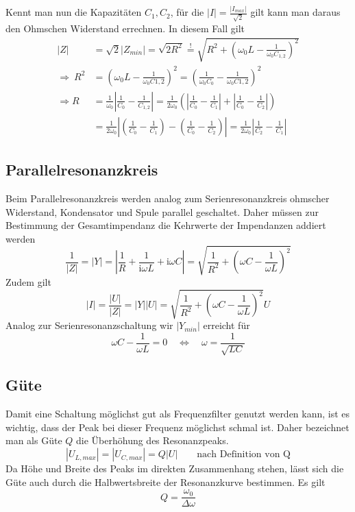 Kennt man nun die Kapazitäten $ C_1, C_2 $, für die $ |I| = \frac{|I_{max}|}{\sqrt{2}} $ gilt kann man daraus den Ohmschen Widerstand errechnen. In diesem Fall gilt \begin{align}
	|Z| &= \sqrt 2 |Z_{min}| = \sqrt{2 R^2} \stackrel{!}{=} \sqrt{R^2 + \left(\omega_0 L - \frac{1}{\omega_0 C_{1,2}}\right)^2} \\
	\Rightarrow~ R^2 &= \left(\omega_0 L - \frac{1}{\omega_0 C{1,2}}\right)^2 = \left(\frac{1}{\omega_0C_0} - \frac{1}{\omega_0 C{1,2}}\right)^2 \\
	\Rightarrow R &= \frac{1}{\omega_0} \left|\frac{1}{C_0} - \frac{1}{C_{1,2}}\right|
		= \frac{1}{2\omega_0} \left(\left|\frac{1}{C_0} - \frac{1}{C_1}\right| + \left|\frac{1}{C_0} - \frac{1}{C_2}\right|\right) \\
		&= \frac{1}{2\omega_0} \left|\left(\frac{1}{C_0} - \frac{1}{C_1}\right) - \left(\frac{1}{C_0} - \frac{1}{C_2}\right)\right| 
		= \frac{1}{2\omega_0} \left|\frac{1}{C_2} - \frac{1}{C_1}\right|
\end{align}
\subsection{Parallelresonanzkreis}
Beim Parallelresonanzkreis werden analog zum Serienresonanzkreis ohmscher Widerstand, Kondensator und Spule parallel geschaltet. Daher müssen zur Bestimmung der Gesamtimpendanz die Kehrwerte der Impendanzen addiert werden \begin{equation}
	\frac{1}{|Z|} = |Y| = \left|\frac{1}{R} + \frac{1}{\mathrm i \omega L} + \mathrm i \omega C\right| = \sqrt{\frac{1}{R^2} + \left(\omega C - \frac{1}{\omega L}\right)^2}
\end{equation}
Zudem gilt \begin{equation}
	|I| = \frac{|U|}{|Z|} = |Y||U| = \sqrt{\frac{1}{R^2} + \left(\omega C - \frac{1}{\omega L}\right)^2} U
\end{equation}
Analog zur Serienresonanzschaltung wir $ |Y_{min}| $ erreicht für \begin{equation}
	\omega C - \frac{1}{\omega L} = 0 \quad \Leftrightarrow \quad \omega = \frac{1}{\sqrt{LC}}
\end{equation}
\subsection{Güte}
Damit eine Schaltung möglichst gut als Frequenzfilter genutzt werden kann, ist es wichtig, dass der Peak bei dieser Frequenz möglichst schmal ist. Daher bezeichnet man als Güte $ Q $ die Überhöhung des Resonanzpeaks. \begin{equation}
	|U_{L,max}| = |U_{C,max}| = Q|U| \qquad \text{nach Definition von Q}
\end{equation}
Da Höhe und Breite des Peaks im direkten Zusammenhang stehen, lässt sich die Güte auch durch die Halbwertsbreite der Resonanzkurve bestimmen. Es gilt
\begin{equation}
	Q = \frac{\omega_0}{\Delta \omega}
\end{equation}
